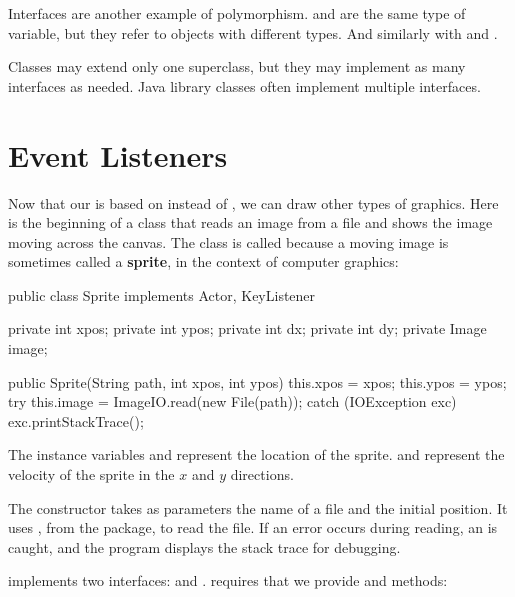Interfaces are another example of polymorphism.
 and  are the same type of variable, but they refer to objects with different types.
And similarly with  and .


Classes may extend only one superclass, but they may implement as many interfaces as needed.
Java library classes often implement multiple interfaces.


\section{Event Listeners}


Now that our  is based on  instead of , we can draw other types of graphics.
Here is the beginning of a class that reads an image from a file and shows the image moving across the canvas.
The class is called  because a moving image is sometimes called a {\bf sprite}, in the context of computer graphics:

\begin{code}
public class Sprite implements Actor, KeyListener {
    private int xpos;
    private int ypos;
    private int dx;
    private int dy;
    private Image image;

    public Sprite(String path, int xpos, int ypos) {
        this.xpos = xpos;
        this.ypos = ypos;
        try {
            this.image = ImageIO.read(new File(path));
        } catch (IOException exc) {
            exc.printStackTrace();
        }
    }
}
\end{code}

The instance variables  and  represent the location of the sprite.
 and  represent the velocity of the sprite in the $x$ and $y$ directions.

The constructor takes as parameters the name of a file and the initial position.
It uses  , from the  package, to read the file.
If an error occurs during reading, an  is caught, and the program displays the stack trace for debugging.

 implements two interfaces:  and .
 requires that we provide  and  methods:

